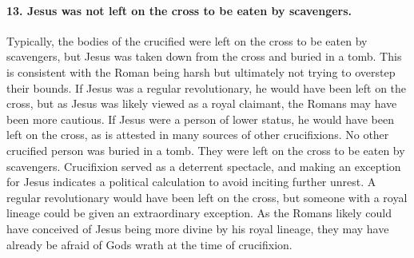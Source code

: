 \paragraph{13.
Jesus was not left on the cross to be eaten by scavengers.}\label{par:jesus-was-not-left-on-the-cross-to-be-eaten-by-scavengers.}
Typically, the bodies of the crucified were left on the cross to be eaten by scavengers, but Jesus was taken down from the cross and buried in a tomb.
This is consistent with the Roman being harsh but ultimately not trying to overstep their bounds.
If Jesus was a regular revolutionary, he would have been left on the cross, but as Jesus was likely viewed as a royal claimant, the Romans may have been more cautious.
If Jesus were a person of lower status, he would have been left on the cross, as is attested in many sources of other crucifixions.
No other crucified person was buried in a tomb.
They were left on the cross to be eaten by scavengers.
Crucifixion served as a deterrent spectacle, and making an exception for Jesus indicates a political calculation to avoid inciting further unrest.
A regular revolutionary would have been left on the cross, but someone with a royal lineage could be given an extraordinary exception.
As the Romans likely could have conceived of Jesus being more divine by his royal lineage, they may have already be afraid of Gods wrath at the time of crucifixion.

